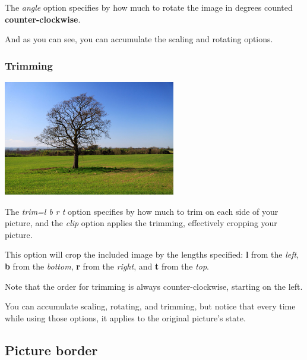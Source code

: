 \documentclass[a4paper]{article}
\begin{document}
The \textit{angle} option specifies by how much to rotate the image in degrees
counted \textbf{counter-clockwise}.

And as you can see, you can accumulate the scaling and rotating options.


\subsubsection{Trimming}
\includegraphics[height=5cm,trim=10mm 5mm 90mm 0mm,clip]{lonely-tree}

The \textit{trim=l b r t} option specifies by how much to trim on each side of
your picture, and the \textit{clip} option applies the trimming, effectively
cropping your picture.

This option will crop the included image by the lengths specified:
\textbf{l} from the \textit{left}, \textbf{b} from the \textit{bottom},
\textbf{r} from the \textit{right}, and \textbf{t} from the \textit{top}.

Note that the order for trimming is always counter-clockwise, starting on the
left.

You can accumulate scaling, rotating, and trimming, but notice that every time
while using those options, it applies to the original picture's state.


\subsection{Picture border}

\setlength\fboxsep{0pt}
\end{document}
